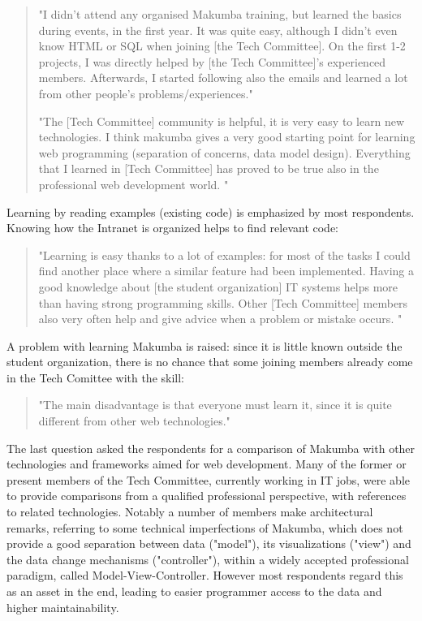 \documentclass{sig-alt-release2}
\begin{document}
\begin{quotation}
	"I didn't attend any organised Makumba training, but learned the basics during events, in the first year. It was quite easy, although I didn't even know HTML or SQL when joining [the Tech Committee]. On the first 1-2 projects, I was directly helped by [the Tech Committee]'s experienced members. Afterwards, I started following also the emails and learned a lot from other people's problems/experiences."
	
	"The [Tech Committee] community is helpful, it is very easy to learn new technologies. I think makumba gives a very good starting point for learning web programming (separation of concerns, data model design). Everything that I learned in [Tech Committee] has proved to be true also in the professional web development world. "
\end{quotation}



Learning by reading examples (existing code) is emphasized by most respondents. Knowing how the Intranet is organized helps to find relevant code:
\begin{quotation}
	"Learning is easy thanks to a lot of examples: for most of the tasks I could find another place where a similar feature had been implemented. Having a good knowledge about [the student organization] IT systems helps more than having strong programming skills. Other [Tech Committee] members also very often help and give advice when a problem or mistake occurs. "
\end{quotation}

A problem with learning Makumba is raised: since it is little known outside the student organization, there is no chance that some joining members already come in the Tech Comittee with the skill:
\begin{quotation}
	"The main disadvantage is that everyone must learn it, since it is quite different from other web technologies."
\end{quotation}


The last question asked the respondents for a comparison of Makumba with other technologies and frameworks aimed for web development. Many of the former or present members of the Tech Committee, currently working in IT jobs, were able to provide comparisons from a qualified professional perspective, with references to related technologies. Notably a number of members make architectural remarks, referring to some technical imperfections of Makumba, which does not provide a good separation between data ("model"), its visualizations ("view") and the data change mechanisms ("controller"), within a widely accepted professional paradigm, called Model-View-Controller. However most respondents regard this as an asset in the end, leading to easier programmer access to the data and higher maintainability.
\end{document}
